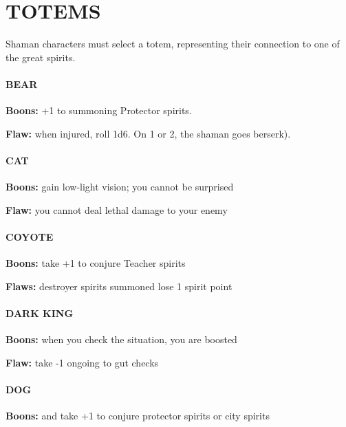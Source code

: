\documentclass[oneside,10pt]{article}
\begin{document}
\section{TOTEMS}
\begin{multicols}{2}
Shaman characters must select a totem, representing their
connection to one of the great spirits.

\paragraph{BEAR}
\begin{dent}
\textbf{Boons:} +1 to summoning Protector spirits.

\textbf{Flaw:} when injured, roll 1d6. On 1 or 2, the shaman goes
berserk).
\end{dent}
\paragraph{CAT}
\begin{dent}
\textbf{Boons:} gain low-light vision; you cannot be surprised

\textbf{Flaw:} you cannot deal lethal damage to your enemy
\end{dent}


\paragraph{COYOTE}
\begin{dent}
\textbf{Boons:} take +1 to conjure Teacher spirits

\textbf{Flaws:} destroyer spirits summoned lose 1 spirit point
\end{dent}

\paragraph{DARK KING}
\begin{dent}
\textbf{Boons:} when you check the situation, you are boosted

\textbf{Flaw:} take -1 ongoing to gut checks
\end{dent}

\paragraph{DOG}
\begin{dent}
\textbf{Boons:} and take +1 to conjure protector spirits or city
spirits


\end{dent}
\end{multicols}
\end{document}
